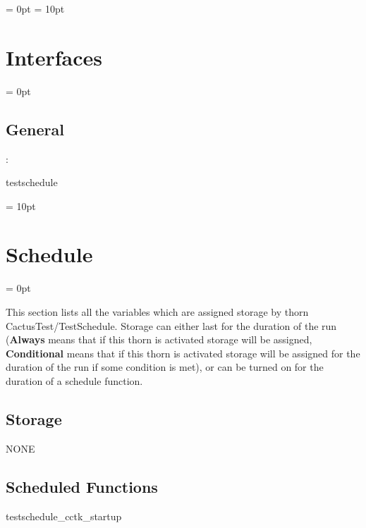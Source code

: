 \parskip = 0pt
\parskip = 10pt 

\section{Interfaces} 


\parskip = 0pt

\vspace{3mm} \subsection*{General}

: 

testschedule
\vspace{2mm}

\vspace{5mm}\parskip = 10pt 

\section{Schedule} 


\parskip = 0pt


\noindent This section lists all the variables which are assigned storage by thorn CactusTest/TestSchedule.  Storage can either last for the duration of the run ({\bf Always} means that if this thorn is activated storage will be assigned, {\bf Conditional} means that if this thorn is activated storage will be assigned for the duration of the run if some condition is met), or can be turned on for the duration of a schedule function.


\subsection*{Storage}NONE
\subsection*{Scheduled Functions}
\vspace{5mm}


\hspace{5mm} testschedule\_cctk\_startup 

\hspace{5mm}{\it test to see if function is placed in schedule and run at cctk\_startup } 


\hspace{5mm}

